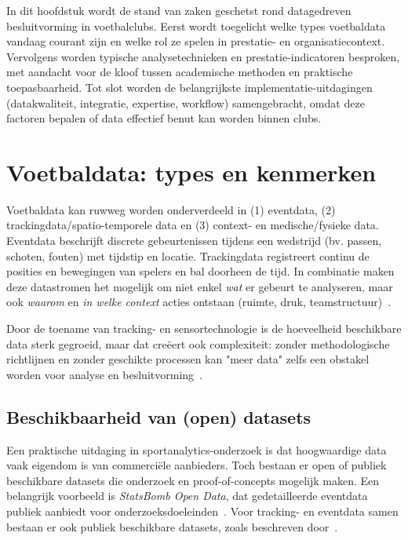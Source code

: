 In dit hoofdstuk wordt de stand van zaken geschetst rond datagedreven besluitvorming in voetbalclubs. Eerst wordt toegelicht welke types voetbaldata vandaag courant zijn en welke rol ze spelen in prestatie- en organisatiecontext.
Vervolgens worden typische analysetechnieken en prestatie-indicatoren besproken, met aandacht voor de kloof tussen academische methoden en praktische toepasbaarheid.
Tot slot worden de belangrijkste implementatie-uitdagingen (datakwaliteit, integratie, expertise, workflow) samengebracht, omdat deze factoren bepalen of data effectief benut kan worden binnen clubs.

\section{Voetbaldata: types en kenmerken}

Voetbaldata kan ruwweg worden onderverdeeld in (1) eventdata, (2) trackingdata/spatio-temporele data en (3) context- en medische/fysieke data.
Eventdata beschrijft discrete gebeurtenissen tijdens een wedstrijd (bv. passen, schoten, fouten) met tijdstip en locatie.
Trackingdata registreert continu de posities en bewegingen van spelers en bal doorheen de tijd.
In combinatie maken deze datastromen het mogelijk om niet enkel \emph{wat} er gebeurt te analyseren, maar ook \emph{waarom} en \emph{in welke context} acties ontstaan (ruimte, druk, teamstructuur)~\autocite{Gudmundsson2017}.

Door de toename van tracking- en sensortechnologie is de hoeveelheid beschikbare data sterk gegroeid, maar dat creëert ook complexiteit: zonder methodologische richtlijnen en zonder geschikte processen kan "meer data" zelfs een obstakel worden voor analyse en besluitvorming~\autocite{Rein2016}.

\subsection{Beschikbaarheid van (open) datasets}

Een praktische uitdaging in sportanalytics-onderzoek is dat hoogwaardige data vaak eigendom is van commerciële aanbieders.
Toch bestaan er open of publiek beschikbare datasets die onderzoek en proof-of-concepts mogelijk maken.
Een belangrijk voorbeeld is \textit{StatsBomb Open Data}, dat gedetailleerde eventdata publiek aanbiedt voor onderzoeksdoeleinden~\autocite{StatsBombOpenData}.
Voor tracking- en eventdata samen bestaan er ook publiek beschikbare datasets, zoals beschreven door~\autocite{Pappalardo2019}.

